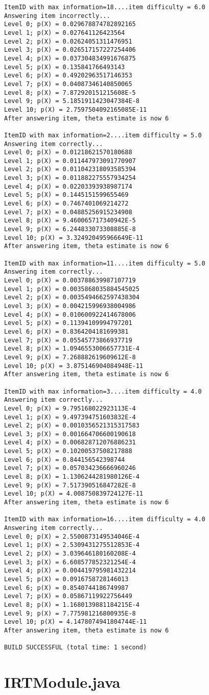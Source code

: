 \begin{verbatim}
ItemID with max information=18....item difficulty = 6.0
Answering item incorrectly...
Level 0; p(X) = 0.029678874782892165
Level 1; p(X) = 0.027641126423564
Level 2; p(X) = 0.02624051311476951
Level 3; p(X) = 0.026517157227254406
Level 4; p(X) = 0.037304834991676875
Level 5; p(X) = 0.135841766493143
Level 6; p(X) = 0.49202963517146353
Level 7; p(X) = 0.04087346140850065
Level 8; p(X) = 7.872920151215608E-5
Level 9; p(X) = 5.1851911423047384E-8
Level 10; p(X) = 2.7597504092165085E-11
After answering item, theta estimate is now 6

ItemID with max information=2....item difficulty = 5.0
Answering item correctly...
Level 0; p(X) = 0.01218621570180688
Level 1; p(X) = 0.011447973091770907
Level 2; p(X) = 0.011042318093585394
Level 3; p(X) = 0.011882275557934254
Level 4; p(X) = 0.02203393938987174
Level 5; p(X) = 0.1445151599655469
Level 6; p(X) = 0.7467401069214272
Level 7; p(X) = 0.04885256915234908
Level 8; p(X) = 9.460065717340942E-5
Level 9; p(X) = 6.244833073308885E-8
Level 10; p(X) = 3.324920495966649E-11
After answering item, theta estimate is now 6

ItemID with max information=11....item difficulty = 5.0
Answering item correctly...
Level 0; p(X) = 0.003788639987107719
Level 1; p(X) = 0.0035868035884545025
Level 2; p(X) = 0.0035494662597438304
Level 3; p(X) = 0.004215996938004986
Level 4; p(X) = 0.010600922414678006
Level 5; p(X) = 0.11394109994797201
Level 6; p(X) = 0.8364204181699381
Level 7; p(X) = 0.05545773866937719
Level 8; p(X) = 1.0946553006657731E-4
Level 9; p(X) = 7.268882619609612E-8
Level 10; p(X) = 3.875146904084948E-11
After answering item, theta estimate is now 6

ItemID with max information=3....item difficulty = 4.0
Answering item correctly...
Level 0; p(X) = 9.795168022923113E-4
Level 1; p(X) = 9.497394751603832E-4
Level 2; p(X) = 0.0010356521315317583
Level 3; p(X) = 0.001664706600190618
Level 4; p(X) = 0.006828712076886231
Level 5; p(X) = 0.10200537508217888
Level 6; p(X) = 0.844156542398744
Level 7; p(X) = 0.057034236666960246
Level 8; p(X) = 1.1306244281980126E-4
Level 9; p(X) = 7.517390516847282E-8
Level 10; p(X) = 4.008750839724127E-11
After answering item, theta estimate is now 6

ItemID with max information=16....item difficulty = 4.0
Answering item correctly...
Level 0; p(X) = 2.5500873149534046E-4
Level 1; p(X) = 2.5309431275512853E-4
Level 2; p(X) = 3.039646180160208E-4
Level 3; p(X) = 6.608577852321254E-4
Level 4; p(X) = 0.004419795981432214
Level 5; p(X) = 0.0916758728146013
Level 6; p(X) = 0.8540744186749987
Level 7; p(X) = 0.05867119922756449
Level 8; p(X) = 1.1680139881184215E-4
Level 9; p(X) = 7.775981216800935E-8
Level 10; p(X) = 4.1478074941804744E-11
After answering item, theta estimate is now 6

BUILD SUCCESSFUL (total time: 1 second)
\end{verbatim}

\chapter{IRTModule.java}
\label{chap:irt-module}
